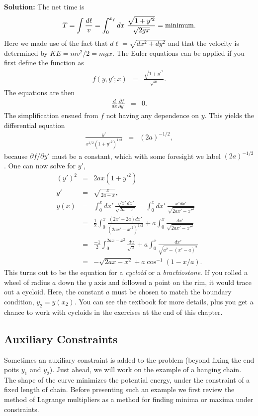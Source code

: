 {\bf Solution:} The net time is
\[
T=\int \frac{d\ell}{v}=\int_0^{x_f}
dx~\frac{\sqrt{1+y'^2}}{\sqrt{2gx}}={\rm minimum}.
\]
Here we made use of the fact that $d\ell=\sqrt{dx^2+dy^2}$ and that
the velocity is determined by $KE=mv^2/2=mgx$. The Euler equations can
be applied if you first define the function as
\begin{eqnarray*}
f(y,y';x)&=&\frac{\sqrt{1+y'^2}}{\sqrt{x}}.
\end{eqnarray*}
The equations are then
\begin{eqnarray*}
\frac{d}{dx}\frac{\partial f}{\partial y'}&=&0.
\end{eqnarray*}
The simplification ensued from $f$ not having any dependence on
$y$. This yields the differential equation
\begin{eqnarray}
\frac{y'}{x^{1/2}(1+y'^2)^{1/2}}&=&(2a)^{-1/2},
\end{eqnarray}
because $\partial f/\partial y'$ must be a constant, which with some
foresight we label $(2a)^{-1/2}$. One can now solve for $y'$,
\begin{eqnarray*}
(y')^2&=&2ax(1+y'^2)\\ \nonumber
  y'&=&\sqrt{\frac{x}{2a-x}},\\ \nonumber y(x)&=&\int_0^x
  dx'~\frac{\sqrt{x'}dx'}{\sqrt{2a-x'}}=\int_0^x
  dx'~\frac{x'dx'}{\sqrt{2ax'-x'^2}}\\ \nonumber
  &=&\frac{1}{2}\int_0^x\frac{(2x'-2a)dx'}{(2ax'-x'^2)^{1/2}}+a\int_0^x\frac{dx'}{\sqrt{2ax'-x'^2}}\\ \nonumber
  &=&\frac{-1}{2}\int_0^{2ax-x^2}\frac{du}{\sqrt{u}}+a\int_0^x\frac{dx'}{\sqrt{a^2-(x'-a)^2}}\\ &=&-\sqrt{2ax-x^2}+a\cos^{-1}(1-x/a).
\end{eqnarray*}
This turns out to be the equation for a {\it cycloid} or a {\it
  brachiostone}. If you rolled a wheel of radius $a$ down the $y$ axis
and followed a point on the rim, it would trace out a cycloid. Here,
the constant $a$ must be chosen to match the boundary condition,
$y_2=y(x_2)$. You can see the textbook for more details, plus you get
a chance to work with cycloids in the exercises at the end of this
chapter.

\exampleend

\subsection{Auxiliary Constraints}

Sometimes an auxiliary constraint is added to the problem (beyond
fixing the end poits $y_1$ and $y_2$). Just ahead, we will work on the
example of a hanging chain. The shape of the curve minimizes the
potential energy, under the constraint of a fixed length of
chain. Before presenting such an example we first review the method of
Lagrange multipliers as a method for finding minima or maxima under
constraints.

